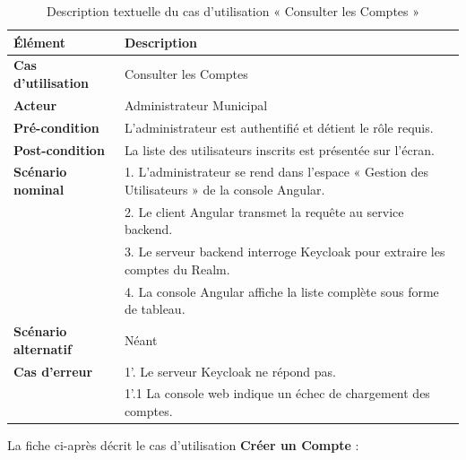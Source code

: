 \begin{table}[H]
    \centering
    \caption{Description textuelle du cas d'utilisation « Consulter les Comptes »}
    \label{tab:txt_cons_comptes}
    \vspace{0.2cm}
    \small
    \begin{tabularx}{\textwidth}{|l|X|}
        \hline
        \textbf{Élément} & \textbf{Description} \\ \hline
        \textbf{Cas d’utilisation} & Consulter les Comptes \\ \hline
        \textbf{Acteur} & Administrateur Municipal \\ \hline
        \textbf{Pré-condition} & L'administrateur est authentifié et détient le rôle requis. \\ \hline
        \textbf{Post-condition} & La liste des utilisateurs inscrits est présentée sur l'écran. \\ \hline
        \textbf{Scénario nominal} &
        1. L'administrateur se rend dans l'espace « Gestion des Utilisateurs » de la console Angular.\\
        & 2. Le client Angular transmet la requête au service backend.\\
        & 3. Le serveur backend interroge Keycloak pour extraire les comptes du Realm.\\
        & 4. La console Angular affiche la liste complète sous forme de tableau. \\ \hline
        \textbf{Scénario alternatif} & Néant \\ \hline
        \textbf{Cas d’erreur} &
        1'. Le serveur Keycloak ne répond pas.\\
        & 1'.1 La console web indique un échec de chargement des comptes. \\ \hline
    \end{tabularx}
\end{table}

La fiche ci-après décrit le cas d'utilisation \textbf{\og Créer un Compte \fg{}} :

